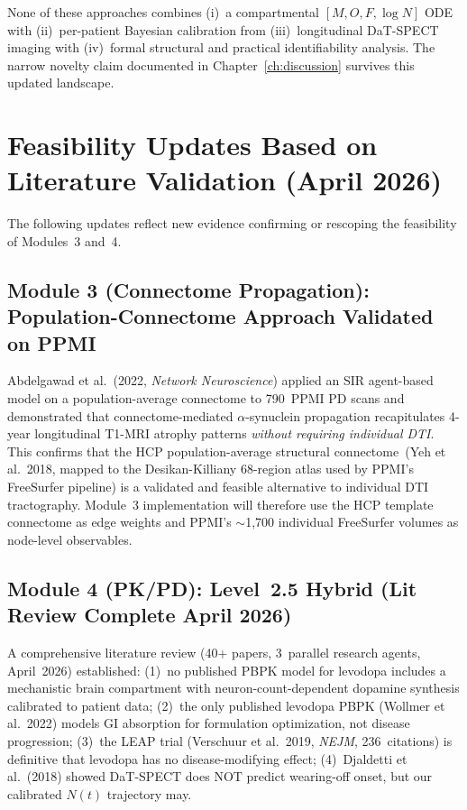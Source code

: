 None of these approaches combines (i)~a compartmental $[M, O, F, \log N]$ ODE with (ii)~per-patient Bayesian calibration from (iii)~longitudinal DaT-SPECT imaging with (iv)~formal structural and practical identifiability analysis. The narrow novelty claim documented in Chapter~\ref{ch:discussion} survives this updated landscape.


\section{Feasibility Updates Based on Literature Validation (April 2026)}
\label{sec:mech-feasibility-updates}

The following updates reflect new evidence confirming or rescoping the feasibility of Modules~3 and~4.

\subsection{Module 3 (Connectome Propagation): Population-Connectome Approach Validated on PPMI}

Abdelgawad et al.\ (2022, \emph{Network Neuroscience}) applied an SIR agent-based model on a population-average connectome to 790~PPMI PD scans and demonstrated that connectome-mediated $\alpha$-synuclein propagation recapitulates 4-year longitudinal T1-MRI atrophy patterns \emph{without requiring individual DTI}. This confirms that the HCP population-average structural connectome~(Yeh et al.\ 2018, mapped to the Desikan-Killiany 68-region atlas used by PPMI's FreeSurfer pipeline) is a validated and feasible alternative to individual DTI tractography. Module~3 implementation will therefore use the HCP template connectome as edge weights and PPMI's $\sim$1,700 individual FreeSurfer volumes as node-level observables.

\subsection{Module 4 (PK/PD): Level~2.5 Hybrid (Lit Review Complete April 2026)}

A comprehensive literature review (40+ papers, 3~parallel research agents, April~2026) established: (1)~no published PBPK model for levodopa includes a mechanistic brain compartment with neuron-count-dependent dopamine synthesis calibrated to patient data; (2)~the only published levodopa PBPK (Wollmer et al.\ 2022) models GI absorption for formulation optimization, not disease progression; (3)~the LEAP trial (Verschuur et al.\ 2019, \emph{NEJM}, 236~citations) is definitive that levodopa has no disease-modifying effect; (4)~Djaldetti et al.\ (2018) showed DaT-SPECT does NOT predict wearing-off onset, but our calibrated $N(t)$ trajectory may.

